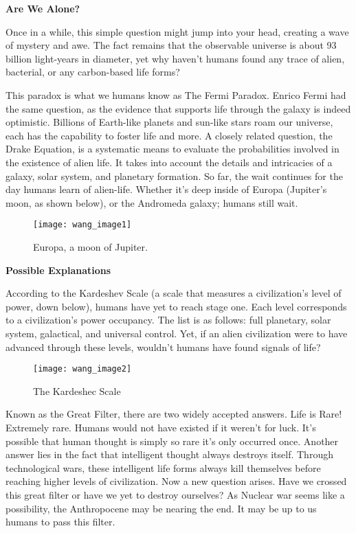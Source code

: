 
\noindent
\textbf{Are We Alone?}

Once in a while, this simple question might jump into your head, creating a wave of mystery and awe. The fact remains that the observable universe is about 93 billion light-years in diameter, yet why haven’t humans found any trace of alien, bacterial, or any carbon-based life forms?

This paradox is what we humans know as The Fermi Paradox. Enrico Fermi had the same question, as the evidence that supports life through the galaxy is indeed optimistic. Billions of Earth-like planets and sun-like stars roam our universe, each has the capability to foster life and more. A closely related question, the Drake Equation, is a systematic means to evaluate the probabilities involved in the existence of alien life. It takes into account the details and intricacies of a galaxy, solar system, and planetary formation. So far, the wait continues for the day humans learn of alien-life. Whether it’s deep inside of Europa (Jupiter’s moon, as shown below), or the Andromeda galaxy; humans still wait.

\renewcommand{\thefigure}{1}
\begin{figure}[h]
  \begin{center}
    \texttt{[image: wang\_image1]}
  \end{center}
  \caption{Europa, a moon of Jupiter.}
  \label{fig:1}
\end{figure}

\noindent
\textbf{Possible Explanations}

According to the Kardeshev Scale (a scale that measures a civilization’s level of power, down below), humans have yet to reach stage one. Each level corresponds to a civilization’s power occupancy. The list is as follows: full planetary, solar system, galactical, and universal control. Yet, if an alien civilization were to have advanced through these levels, wouldn’t humans have found signals of life? 

\begin{figure}[htp]
    \centering
    \texttt{[image: wang\_image2]}
    \caption{The Kardeshec Scale}
    \label{fig:2}
\end{figure}

\pagebreak

Known as the Great Filter, there are two widely accepted answers. Life is Rare! Extremely rare. Humans would not have existed if it weren’t for luck. It’s possible that human thought is simply so rare it’s only occurred once. Another answer lies in the fact that intelligent thought always destroys itself. Through technological wars, these intelligent life forms always kill themselves before reaching higher levels of civilization. Now a new question arises. Have we crossed this great filter or have we yet to destroy ourselves? As Nuclear war seems like a possibility, the Anthropocene may be nearing the end. It may be up to us humans to pass this filter.
